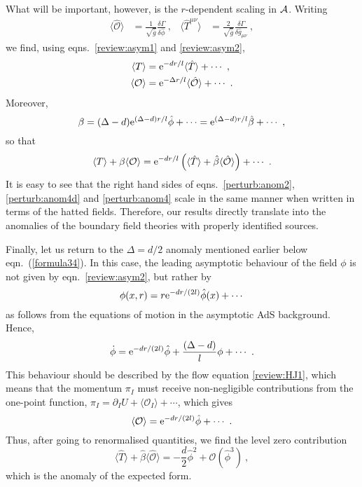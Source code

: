 \documentclass[a4paper,12pt]{article}
\begin{document}
What will be important, however, is the $r$-dependent scaling in 
${\cal A}$. Writing 
\begin{align}
\label{perurb:Ohat}
  \langle\hat{\mathcal{O}} \rangle &= \frac1{\sqrt{\hat{g}}} \frac{\delta
  \Gamma}{\delta \hat{\phi}}~, &
\langle \hat{T}^{\mu\nu} \rangle &= \frac2{\sqrt{\hat{g}}} \frac{\delta
  \Gamma}{\delta \hat{g}_{\mu\nu}}~, 
\end{align}
we find, using eqns.\ \eqref{review:asym1} and \eqref{review:asym2}, 
\begin{align}
\label{perturb:TThat}
  \langle T \rangle &= \mathrm{e}^{-dr/l} \langle \hat{T} \rangle +\cdots~,\\
\label{perturb:OOhat}
  \langle \mathcal{O} \rangle &= \mathrm{e}^{-\Delta r/l} 
  \langle\hat{\mathcal{O}} \rangle +\cdots~.
\end{align}
Moreover, 
\begin{equation}
\label{perturb:betahat}
  \beta = (\Delta-d) \mathrm{e}^{(\Delta-d)r/l} \hat{\phi} +\cdots =
  \mathrm{e}^{(\Delta-d)r/l} \hat{\beta} +\cdots~,
\end{equation}
so that 
\begin{equation}
\label{perturb:TOTOhat}
  \langle T \rangle + \beta \langle \mathcal{O} \rangle = 
  \mathrm{e}^{-dr/l} \left( \langle \hat{T} \rangle + \hat{\beta}
  \langle\hat{\mathcal{O}} \rangle \right) + \cdots~.
\end{equation}
It is easy to see that the right hand sides of eqns.\
\eqref{perturb:anom2}, \eqref{perturb:anom4d} and
\eqref{perturb:anom4} scale in the same manner when written in terms
of the hatted fields. Therefore, our results directly translate into
the anomalies of the boundary field theories with properly identified
sources. 

Finally, let us return to the $\Delta=d/2$ anomaly mentioned earlier below 
eqn.\ (\ref{formula34}). In
this case, the leading asymptotic behaviour of the field $\phi$ is not
given by eqn.\ \eqref{review:asym2}, but rather by 
\begin{equation}
\label{perturb:Deltad2}
  \phi(x,r) = r \mathrm{e}^{-dr/(2l)} \hat{\phi} (x) +\cdots
\end{equation}
as follows from the equations of motion in the asymptotic AdS background.
Hence, 
\[ \dot{\phi} = \mathrm{e}^{-dr/(2l)} \hat{\phi} + \frac{(\Delta-d)}{l} \phi +\cdots~. \]
This behaviour should be described by the flow equation
\eqref{review:HJ1}, which means that the momentum $\pi_I$ must receive 
non-negligible contributions from
the one-point function, $\pi_I = \partial_I U +\langle \mathcal{O}_I
\rangle +\cdots$, which gives 
\[ \langle \mathcal{O} \rangle = \mathrm{e}^{-dr/(2l)} \hat{\phi} +\cdots~.\]
Thus, after going to renormalised quantities, we find the level zero
contribution 
\begin{equation}
\label{perturb:Deltad2anom}
  \langle \hat{T}\rangle+\hat{\beta} \langle \hat{\mathcal{O}} 
  \rangle = -\frac{d}2
  \hat{\phi}^2 +\mathcal{O}(\hat{\phi}^3)~,
\end{equation}
which is the anomaly of the expected form.
\end{document}
